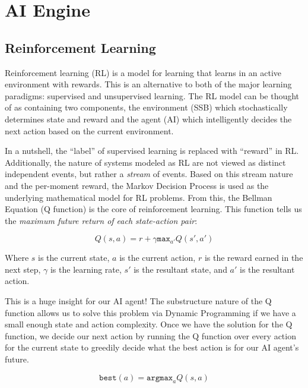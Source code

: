 \chapter*{AI Engine}

\section*{Reinforcement Learning}
Reinforcement learning (RL) is a model for learning that learns in an active environment with rewards.
This is an alternative to both of the major learning paradigms: supervised and unsupervised learning.
The RL model can be thought of as containing two components, the environment (SSB) which stochastically determines state and reward and the agent (AI) which intelligently decides the next action based on the current environment.


In a nutshell, the ``label'' of supervised learning is replaced with ``reward'' in RL.
Additionally, the nature of systems modeled as RL are not viewed as distinct independent events, but rather a \textit{stream} of events.
Based on this stream nature and the per-moment reward, the Markov Decision Process is used as the underlying mathematical model for RL problems.
From this, the Bellman Equation (Q function) is the core of reinforcement learning. 
This function tells us the \textit{maximum future return of each state-action pair}:

\begin{equation}
  Q(s,a) = r + \gamma \texttt{max}_{a'}Q(s', a')
\end{equation}

Where $s$ is the current state, $a$ is the current action, $r$ is the reward earned in the next step, $\gamma$ is the learning rate, $s'$ is the resultant state, and $a'$ is the resultant action.

This is a huge insight for our AI agent!
The substructure nature of the Q function allows us to solve this problem via Dynamic Programming if we have a small enough state and action complexity.
Once we have the solution for the Q function, we decide our next action by running the Q function over every action for the current state to greedily decide what the best action is for our AI agent's future.

\begin{equation}
  \texttt{best}(a) = \texttt{argmax}_a Q(s, a)
\end{equation}

